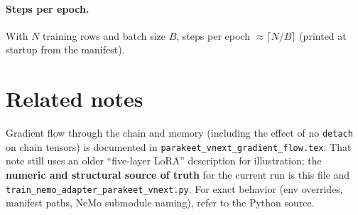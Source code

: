 \documentclass[11pt,a4paper]{article}
\begin{document}
\paragraph{Steps per epoch.}
With $N$ training rows and batch size $B$, steps per epoch $\approx \lceil N / B \rceil$ (printed at startup from the manifest).

\section{Related notes}

Gradient flow through the chain and memory (including the effect of no \texttt{detach} on chain tensors) is documented in \texttt{parakeet\_vnext\_gradient\_flow.tex}. That note still uses an older ``five-layer LoRA'' description for illustration; the \textbf{numeric and structural source of truth} for the current run is this file and \texttt{train\_nemo\_adapter\_parakeet\_vnext.py}. For exact behavior (env overrides, manifest paths, NeMo submodule naming), refer to the Python source.
\end{document}
